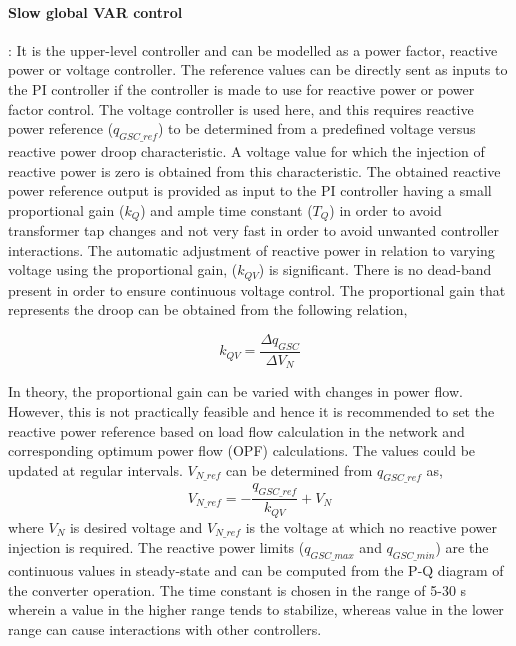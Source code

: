 \paragraph{Slow global VAR control}:
It is the upper-level controller and can be modelled as a power factor, reactive power or voltage controller. The reference values can be directly sent as inputs to the \gls{PI} controller if the controller is made to use for reactive power or power factor control. The voltage controller is used here, and this requires reactive power reference ($q_{GSC\_ref}$) to be determined from a predefined voltage versus reactive power droop characteristic. A voltage value for which the injection of reactive power is zero is obtained from this characteristic. The obtained reactive power reference output is provided as input to the \gls{PI} controller having a small proportional gain ($k_Q$) and ample time constant ($T_Q$) in order to avoid transformer tap changes and not very fast in order to avoid unwanted controller interactions. The automatic adjustment of reactive power in relation to varying voltage using the proportional gain, ($k_{QV}$) is significant. There is no dead-band present in order to ensure continuous voltage control. The  proportional gain that represents the droop can be obtained from the following relation,

\begin{equation}
    k_{QV} = \frac{\Delta q_{GSC}}{\Delta V_N}
\end{equation}

In theory, the proportional gain can be varied with changes in power flow. However, this is not practically feasible and hence it is recommended to set the reactive power reference based on load flow calculation in the network and corresponding optimum power flow (OPF) calculations. The values could be updated at regular intervals. $V_{N\_{ref}}$ can be determined from $q_{GSC\_ref}$ as,
\begin{equation}
    V_{N\_{ref}} = -\frac{q_{GSC\_ref}}{k_{QV}} + V_N
\end{equation}
where $V_N$ is desired voltage and $V_{N\_{ref}}$ is the voltage at which no reactive power injection is required.
The reactive power limits ($q_{GSC\_max}$ and $q_{GSC\_min}$) are the continuous values in steady-state and can be computed from the P-Q diagram of the converter operation. The time constant is chosen in the range of 5-30 s wherein a value in the higher range tends to stabilize, whereas value in the lower range can cause interactions with other controllers.

